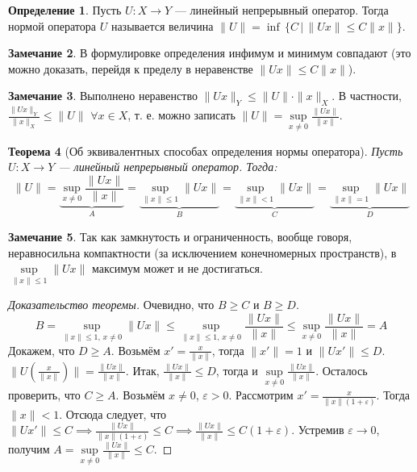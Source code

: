\documentclass[11pt,openany,a4paper]{scrartcl}
\theoremstyle{plain}
\newtheorem{theorem}{Теорема}[subsection]
\theoremstyle{definition}
\newtheorem{definition}[theorem]{Определение}
\newtheorem{remark}[theorem]{Замечание}
\begin{document}
\begin{definition}
    Пусть $U: X \to Y$ — линейный непрерывный оператор. Тогда нормой оператора $U$
    называется величина $\|U\| = \inf\,\{C\,\big|\,\|Ux\| \leqslant C \|x\|\}$.
\end{definition}
\begin{remark}
    В формулировке определения инфимум и минимум совпадают (это можно доказать, перейдя к 
    пределу в неравенстве $\|Ux\| \leqslant C \|x\|$).
\end{remark}
\begin{remark}
    Выполнено неравенство $\|Ux\|_Y \leqslant \|U\|\cdot \|x\|_X$. В частности,
    $\frac{\|Ux\|_Y}{\|x\|_X} \leqslant \|U\|$ $\forall x \in X$, т. е. можно записать
    $\|U\| = \sup\limits_{x \neq 0}\frac{\|Ux\|}{\|x\|}$. 
\end{remark}
\begin{theorem}[Об эквивалентных способах определения нормы оператора]
     Пусть $U: X \to Y$ — линейный непрерывный оператор. Тогда:
     $$
     \|U\| = \underbrace{\sup\limits_{x \neq 0}\frac{\|Ux\|}{\|x\|}}_A =
     \underbrace{\sup\limits_{\|x\|\leqslant 1} \|Ux\|}_B =
     \underbrace{\sup\limits_{\|x\| < 1} \|Ux\|}_C =
     \underbrace{\sup\limits_{\|x\| = 1} \|Ux\|}_D
     $$
\end{theorem}
\begin{remark}
    Так как замкнутость и ограниченность, вообще говоря, неравносильна компактности
    (за исключением конечномерных пространств),
    в $\sup\limits_{\|x\|\leqslant 1} \|Ux\|$ максимум может и не достигаться.
\end{remark}
\begin{proof}[Доказательство теоремы]
    Очевидно, что $B \geqslant C$ и $B \geqslant D$.
    $$
    B =\sup\limits_{\|x\|\leqslant 1,\,x \neq 0} \|Ux\| \leqslant
    \sup\limits_{\|x\|\leqslant 1,\,x \neq 0} \frac{\|Ux\|}{\|x\|} \leqslant
    \sup\limits_{x \neq 0} \frac{\|Ux\|}{\|x\|} = A
    $$
    Докажем, что $D \geqslant A$. Возьмём $x'=\frac{x}{\|x\|}$, тогда $\|x'\|=1$ и
    $\|Ux'\|\leqslant D$. $\|U(\frac{x}{\|x\|})\| = \frac{\|Ux\|}{\|x\|}$.
    Итак, $\frac{\|Ux\|}{\|x\|} \leqslant D$, тогда и
    $\sup\limits_{x \neq 0}\frac{\|Ux\|}{\|x\|}$.
    Осталось проверить, что $C \geqslant A$. Возьмём $x \neq 0$, $\varepsilon > 0$.
    Рассмотрим $x' = \frac{x}{\|x\|(1 + \varepsilon)}$. Тогда $\|x\| < 1$. Отсюда
    следует, что $\|Ux'\| \leqslant C \implies \frac{\|Ux\|}{\|x\|(1+\varepsilon)}
    \leqslant C \implies \frac{\|Ux\|}{\|x\|}\leqslant C(1 + \varepsilon)$. Устремив
    $\varepsilon \to 0$, получим
    $A = \sup\limits_{x \neq 0} \frac{\|Ux\|}{\|x\|} \leqslant C$.
\end{proof}
\end{document}
